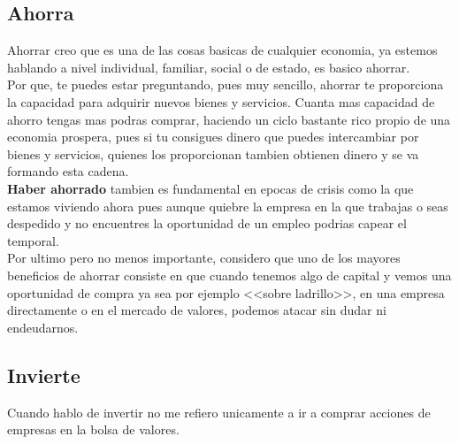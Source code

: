 \subsection{Ahorra}

Ahorrar creo que es una de las cosas basicas de cualquier economia, ya estemos hablando a nivel individual, familiar, social o de estado, es basico ahorrar.\\

Por que, te puedes estar preguntando, pues muy sencillo, ahorrar te proporciona la capacidad para adquirir nuevos bienes y servicios. Cuanta mas capacidad de ahorro tengas mas podras comprar, haciendo un ciclo bastante rico propio de una economia prospera, pues si tu consigues dinero que puedes intercambiar por bienes y servicios, quienes los proporcionan tambien obtienen dinero y se va formando esta cadena.\\

\textbf{Haber ahorrado} tambien es fundamental en epocas de crisis como la que estamos viviendo ahora pues aunque quiebre la empresa en la que trabajas o seas despedido y no encuentres la oportunidad de un empleo podrias capear el temporal.\\

Por ultimo pero no menos importante, considero que uno de los mayores beneficios de ahorrar consiste en que cuando tenemos algo de capital y vemos una oportunidad de compra ya sea por ejemplo <<sobre ladrillo>>, en una empresa directamente o en el mercado de valores, podemos atacar sin dudar ni endeudarnos.

\subsection{Invierte}

Cuando hablo de invertir no me refiero unicamente a ir a comprar acciones de empresas en la bolsa de valores. \\

